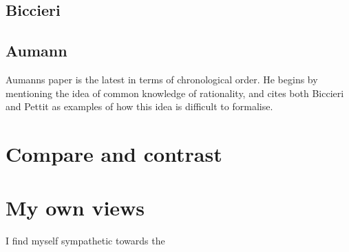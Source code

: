 \documentclass{article}
\begin{document}
\subsection{Biccieri}
\subsection{Aumann}
Aumanns paper is the latest in terms of chronological order. He begins by mentioning the idea of common knowledge of rationality, and cites both Biccieri and Pettit as examples of how this idea is difficult to formalise.

\section{Compare and contrast}

\section{My own views}
I find myself sympathetic towards the
\end{document}
